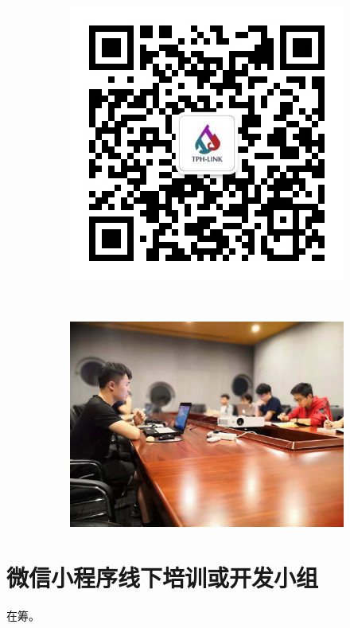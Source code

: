 \documentclass[12pt]{ctexart}
\begin{document}
\begin{figure}[!ht]
\centering
  \begin{subfigure}[b]{0.4\textwidth}
  \includegraphics[width=\textwidth]{qrcode.jpg}
    \end{subfigure}~
      \begin{subfigure}[b]{0.5\textwidth}
  \includegraphics[width=\textwidth]{tensorflow_first.jpg}  
   \label{tensorflow} 
    \end{subfigure}
\end{figure}
\section{微信小程序线下培训或开发小组}
在筹。
\end{document}
